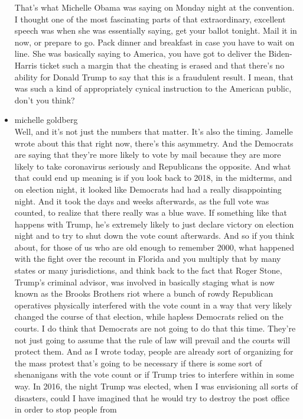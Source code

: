 \begin{itemize}
  That's what Michelle Obama was saying on Monday night at the
  convention. I thought one of the most fascinating parts of that
  extraordinary, excellent speech was when she was essentially saying,
  get your ballot tonight. Mail it in now, or prepare to go. Pack dinner
  and breakfast in case you have to wait on line. She was basically
  saying to America, you have got to deliver the Biden-Harris ticket
  such a margin that the cheating is erased and that there's no ability
  for Donald Trump to say that this is a fraudulent result. I mean, that
  was such a kind of appropriately cynical instruction to the American
  public, don't you think?
\item
  michelle goldberg\\
  Well, and it's not just the numbers that matter. It's also the timing.
  Jamelle wrote about this that right now, there's this asymmetry. And
  the Democrats are saying that they're more likely to vote by mail
  because they are more likely to take coronavirus seriously and
  Republicans the opposite. And what that could end up meaning is if you
  look back to 2018, in the midterms, and on election night, it looked
  like Democrats had had a really disappointing night. And it took the
  days and weeks afterwards, as the full vote was counted, to realize
  that there really was a blue wave. If something like that happens with
  Trump, he's extremely likely to just declare victory on election night
  and to try to shut down the vote count afterwards. And so if you think
  about, for those of us who are old enough to remember 2000, what
  happened with the fight over the recount in Florida and you multiply
  that by many states or many jurisdictions, and think back to the fact
  that Roger Stone, Trump's criminal advisor, was involved in basically
  staging what is now known as the Brooks Brothers riot where a bunch of
  rowdy Republican operatives physically interfered with the vote count
  in a way that very likely changed the course of that election, while
  hapless Democrats relied on the courts. I do think that Democrats are
  not going to do that this time. They're not just going to assume that
  the rule of law will prevail and the courts will protect them. And as
  I wrote today, people are already sort of organizing for the mass
  protest that's going to be necessary if there is some sort of
  shenanigans with the vote count or if Trump tries to interfere within
  in some way. In 2016, the night Trump was elected, when I was
  envisioning all sorts of disasters, could I have imagined that he
  would try to destroy the post office in order to stop people from

\end{itemize}
